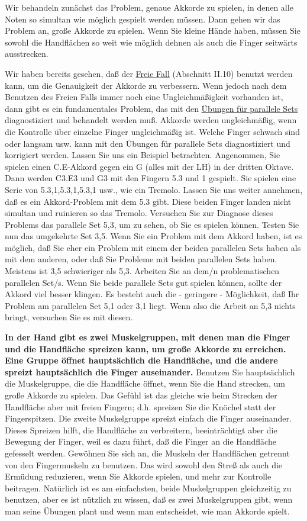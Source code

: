 Wir behandeln zunächst das Problem, genaue Akkorde zu spielen, in denen alle Noten so simultan wie möglich gespielt werden müssen.
Dann gehen wir das Problem an, große Akkorde zu spielen.
Wenn Sie kleine Hände haben, müssen Sie sowohl die Handflächen so weit wie möglich dehnen als auch die Finger seitwärts ausstrecken.

Wir haben bereits gesehen, daß der \hyperref[c1ii10]{Freie Fall} (Abschnitt II.10) benutzt werden kann, um die Genauigkeit der Akkorde zu verbessern.
Wenn jedoch nach dem Benutzen des Freien Falls immer noch eine Ungleichmäßigkeit vorhanden ist, dann gibt es ein fundamentales Problem, das mit den \hyperref[c1iii7b]{Übungen für parallele Sets} diagnostiziert und behandelt werden muß.
Akkorde werden ungleichmäßig, wenn die Kontrolle über einzelne Finger ungleichmäßig ist.
Welche Finger schwach sind oder langsam usw. kann mit den Übungen für parallele Sets diagnostiziert und korrigiert werden.
Lassen Sie uns ein Beispiel betrachten.
Angenommen, Sie spielen einen C.E-Akkord gegen ein G (alles mit der LH) in der dritten Oktave.
Dann werden C3.E3 und G3 mit den Fingern 5.3 und 1 gespielt.
Sie spielen eine Serie von 5.3,1,5.3,1,5.3,1 usw., wie ein Tremolo.
Lassen Sie uns weiter annehmen, daß es ein Akkord-Problem mit dem 5.3 gibt.
Diese beiden Finger landen nicht simultan und ruinieren so das Tremolo.
Versuchen Sie zur Diagnose dieses Problems das parallele Set 5,3, um zu sehen, ob Sie es spielen können.
Testen Sie nun das umgekehrte Set 3,5.
Wenn Sie ein Problem mit dem Akkord haben, ist es möglich, daß Sie eher ein Problem mit einem der beiden parallelen Sets haben als mit dem anderen, oder daß Sie Probleme mit beiden parallelen Sets haben.
Meistens ist 3,5 schwieriger als 5,3.
Arbeiten Sie an dem/n problematischen parallelen Set/s.
Wenn Sie beide parallele Sets gut spielen können, sollte der Akkord viel besser klingen.
Es besteht auch die - geringere - Möglichkeit, daß Ihr Problem am parallelen Set 5,1 oder 3,1 liegt.
Wenn also die Arbeit an 5,3 nichts bringt, versuchen Sie es mit diesen.

\textbf{In der Hand gibt es zwei Muskelgruppen, mit denen man die Finger und die Handfläche spreizen kann, um große Akkorde zu erreichen.
Eine Gruppe öffnet hauptsächlich die Handfläche, und die andere spreizt hauptsächlich die Finger auseinander.}
Benutzen Sie hauptsächlich die Muskelgruppe, die die Handfläche öffnet, wenn Sie die Hand strecken, um große Akkorde zu spielen.
Das Gefühl ist das gleiche wie beim Strecken der Handfläche aber mit freien Fingern; d.h. spreizen Sie die Knöchel statt der Fingerspitzen.
Die zweite Muskelgruppe spreizt einfach die Finger auseinander.
Dieses Spreizen hilft, die Handfläche zu verbreitern, beeinträchtigt aber die Bewegung der Finger, weil es dazu führt, daß die Finger an die Handfläche gefesselt werden.
Gewöhnen Sie sich an, die Muskeln der Handflächen getrennt von den Fingermuskeln zu benutzen.
Das wird sowohl den Streß als auch die Ermüdung reduzieren, wenn Sie Akkorde spielen, und mehr zur Kontrolle beitragen.
Natürlich ist es am einfachsten, beide Muskelgruppen gleichzeitig zu benutzen, aber es ist nützlich zu wissen, daß es zwei Muskelgruppen gibt, wenn man seine Übungen plant und wenn man entscheidet, wie man Akkorde spielt.

